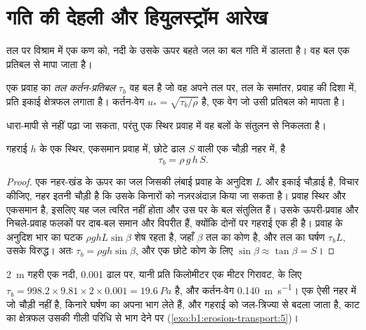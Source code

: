 \section{गति की देहली और हियुलस्ट्रॉम आरेख}\label{sec:b1:erosion-transport:threshold}

तल पर विश्राम में एक कण को, नदी के उसके ऊपर बहते जल का बल गति में डालता है। वह बल एक प्रतिबल से मापा जाता है।

\begin{definition}[तल कर्तन-प्रतिबल, कर्तन-वेग]\label{def:b1:erosion-transport:bed-shear}
एक प्रवाह का \emph{तल कर्तन-प्रतिबल} $\tau_b$ वह बल है जो वह अपने तल पर, तल के समांतर, प्रवाह की दिशा में, प्रति इकाई क्षेत्रफल लगाता है। कर्तन-वेग $u_* = \sqrt{\tau_b/\rho}$ है, एक वेग जो उसी प्रतिबल को मापता है।
\end{definition}

 धारा-मापी से नहीं पढ़ा जा सकता, परंतु एक स्थिर प्रवाह में वह बलों के संतुलन से निकलता है।

\begin{proposition}\label{prop:b1:erosion-transport:depth-slope}
गहराई $h$ के एक स्थिर, एकसमान प्रवाह में, छोटे ढाल $S$ वाली एक चौड़ी नहर में,  है
\[
  \tau_b = \rho\,g\,h\,S .
\]
\end{proposition}

\begin{proof}
एक नहर-खंड के ऊपर का जल जिसकी लंबाई प्रवाह के अनुदिश $L$ और इकाई चौड़ाई है, विचार कीजिए, नहर इतनी चौड़ी है कि उसके किनारों को नज़रअंदाज़ किया जा सकता है। प्रवाह स्थिर और एकसमान है, इसलिए यह जल त्वरित नहीं होता और उस पर के बल संतुलित हैं। उसके ऊपरी-प्रवाह और निचले-प्रवाह फलकों पर दाब-बल समान और विपरीत हैं, क्योंकि दोनों पर गहराई एक ही है। प्रवाह के अनुदिश भार का घटक $\rho g h L \sin\beta$ शेष रहता है, जहाँ $\beta$ तल का कोण है, और तल का घर्षण $\tau_b L$, उसके विरुद्ध। अतः $\tau_b
= \rho g h \sin\beta$, और एक छोटे कोण के लिए $\sin\beta \approx \tan\beta = S$।
\end{proof}

\qty{2}{m} गहरी एक नदी, \num{0.001} ढाल पर, यानी प्रति किलोमीटर एक मीटर गिरावट, के लिए $\tau_b = 998.2 \times 9.81 \times 2 \times 0.001 =
\qty{19.6}{Pa}$ है, और कर्तन-वेग \qty{0.140}{m.s^{-1}}। एक ऐसी नहर में जो चौड़ी नहीं है, किनारे घर्षण का अपना भाग लेते हैं, और गहराई को जल-त्रिज्या से बदला जाता है, काट का क्षेत्रफल उसकी गीली परिधि से भाग देने पर (\cref{exo:b1:erosion-transport:5})।


